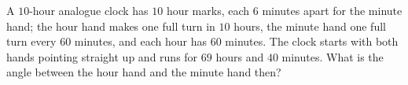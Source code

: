 A $10$-hour analogue clock has $10$ hour marks, each $6$ minutes apart for the minute hand; the hour hand makes one full turn in $10$ hours, the minute hand one full turn every $60$ minutes, and each hour has $60$ minutes. The clock starts with both hands pointing straight up and runs for $69$ hours and $40$ minutes. What is the angle between the hour hand and the minute hand then?
